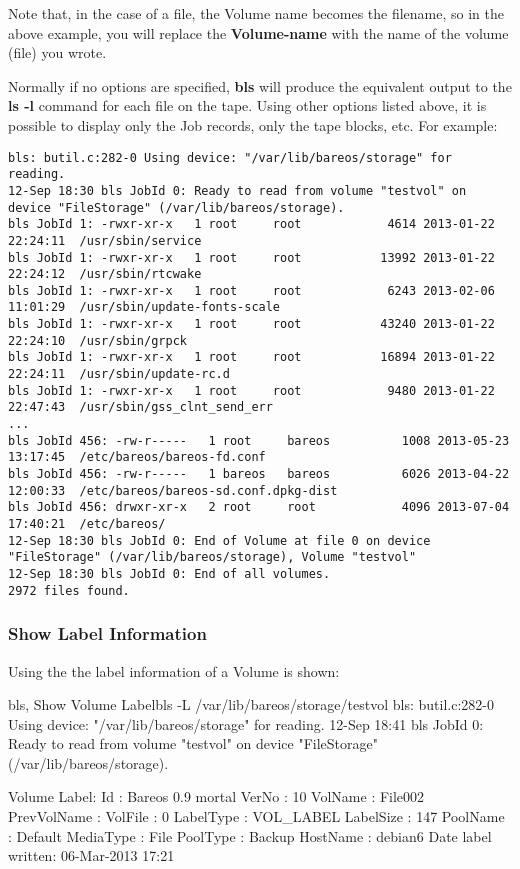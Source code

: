 Note that, in the case of a file, the Volume name becomes the filename, so in
the above example, you will replace the {\bf Volume-name} with the name of the volume
(file) you wrote.

Normally if no options are specified, {\bf bls} will produce the equivalent
output to the {\bf ls -l} command for each file on the tape. Using other
options listed above, it is possible to display only the Job records, only the
tape blocks, etc. For example:

\footnotesize
\begin{verbatim}
bls: butil.c:282-0 Using device: "/var/lib/bareos/storage" for reading.
12-Sep 18:30 bls JobId 0: Ready to read from volume "testvol" on device "FileStorage" (/var/lib/bareos/storage).
bls JobId 1: -rwxr-xr-x   1 root     root            4614 2013-01-22 22:24:11  /usr/sbin/service
bls JobId 1: -rwxr-xr-x   1 root     root           13992 2013-01-22 22:24:12  /usr/sbin/rtcwake
bls JobId 1: -rwxr-xr-x   1 root     root            6243 2013-02-06 11:01:29  /usr/sbin/update-fonts-scale
bls JobId 1: -rwxr-xr-x   1 root     root           43240 2013-01-22 22:24:10  /usr/sbin/grpck
bls JobId 1: -rwxr-xr-x   1 root     root           16894 2013-01-22 22:24:11  /usr/sbin/update-rc.d
bls JobId 1: -rwxr-xr-x   1 root     root            9480 2013-01-22 22:47:43  /usr/sbin/gss_clnt_send_err
...
bls JobId 456: -rw-r-----   1 root     bareos          1008 2013-05-23 13:17:45  /etc/bareos/bareos-fd.conf
bls JobId 456: -rw-r-----   1 bareos   bareos          6026 2013-04-22 12:00:33  /etc/bareos/bareos-sd.conf.dpkg-dist
bls JobId 456: drwxr-xr-x   2 root     root            4096 2013-07-04 17:40:21  /etc/bareos/
12-Sep 18:30 bls JobId 0: End of Volume at file 0 on device "FileStorage" (/var/lib/bareos/storage), Volume "testvol"
12-Sep 18:30 bls JobId 0: End of all volumes.
2972 files found.
\end{verbatim}
\normalsize


\subsubsection{Show Label Information}

Using the  the label information of a Volume is shown:

\begin{commandOut}{bls, Show Volume Label}{}{bls -L /var/lib/bareos/storage/testvol}
bls: butil.c:282-0 Using device: "/var/lib/bareos/storage" for reading.
12-Sep 18:41 bls JobId 0: Ready to read from volume "testvol" on device "FileStorage" (/var/lib/bareos/storage).

Volume Label:
Id                : Bareos 0.9 mortal
VerNo             : 10
VolName           : File002
PrevVolName       :
VolFile           : 0
LabelType         : VOL_LABEL
LabelSize         : 147
PoolName          : Default
MediaType         : File
PoolType          : Backup
HostName          : debian6
Date label written: 06-Mar-2013 17:21
\end{commandOut}


